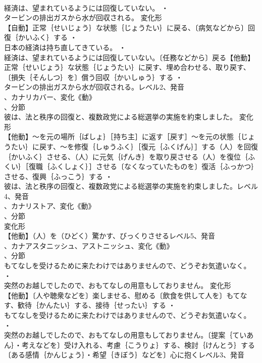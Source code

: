 \documentclass[8pt]{extreport}
\begin{document}
\begin{CJK}{UTF8}{min}
\\	経済は、望まれているようには回復していない。 ・
\\	タービンの排出ガスから水が回収される。	変化形 
\\	【自動】正常｛せいじょう｝な状態｛じょうたい｝に戻る、〔病気などから〕回復｛かいふく｝する ・
\\	日本の経済は持ち直してきている。 ・
\\	経済は、望まれているようには回復していない。〔任務などから〕戻る【他動】正常｛せいじょう｝な状態｛じょうたい｝に戻す、埋め合わせる、取り戻す、〔損失｛そんしつ｝を〕償う回収｛かいしゅう｝する ・
\\	タービンの排出ガスから水が回収される。レベル2、発音
\\	、カナリカバー、変化《動》
\\	、分節
\\	彼は、法と秩序の回復と、複数政党による総選挙の実施を約束しました。	変化形 
\\	【他動】～を元の場所｛ばしょ｝［持ち主］に返す［戻す］～を元の状態｛じょうたい｝に戻す、～を修復｛しゅうふく｝［復元｛ふくげん｝］する（人）を回復｛かいふく｝させる、（人）に元気｛げんき｝を取り戻させる（人）を復位｛ふくい｝［復職｛ふくしょく｝］させる〔なくなっていたものを〕復活｛ふっかつ｝させる、復興｛ふっこう｝する ・
\\	彼は、法と秩序の回復と、複数政党による総選挙の実施を約束しました。レベル4、発音
\\	、カナリストア、変化《動》
\\	、分節
\\	変化形 
\\	【他動】（人）を（ひどく）驚かす、びっくりさせるレベル5、発音
\\	、カナアスタニッシュ、アストニッシュ、変化《動》
\\	、分節
\\	もてなしを受けるために来たわけではありませんので、どうぞお気遣いなく。 ・
\\	突然のお越しでしたので、おもてなしの用意もしておりません。	変化形 
\\	【他動】〔人や聴衆などを〕楽しませる、慰める〔飲食を供して人を〕もてなす、歓待｛かんたい｝する、接待｛せったい｝する ・
\\	もてなしを受けるために来たわけではありませんので、どうぞお気遣いなく。 ・
\\	突然のお越しでしたので、おもてなしの用意もしておりません。〔提案｛ていあん｝・考えなどを〕受け入れる、考慮｛こうりょ｝する、検討｛けんとう｝する〔ある感情｛かんじょう｝・希望｛きぼう｝などを〕心に抱くレベル3、発音

\end{CJK}
\end{document}
